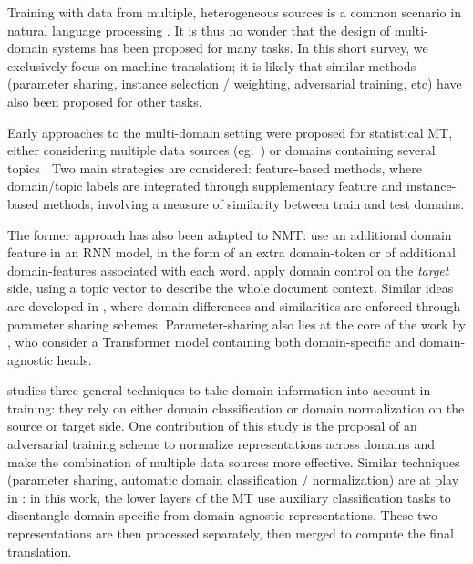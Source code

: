 \documentclass[11pt,a4paper]{article}
\begin{document}
Training with data from multiple, heterogeneous sources is a common scenario in natural language processing \cite{Dredze08online,Finkel09hierarchical}. It is thus no wonder that the design of multi-domain systems has been proposed for many tasks. In this short survey, we exclusively focus on machine translation; it is likely that similar methods (parameter sharing, instance selection / weighting, adversarial training, etc) have also been proposed for other tasks.

Early approaches to the multi-domain setting were proposed for statistical MT, either considering multiple data sources (eg.\ \cite{Banerjee10combining,Clark12onesystem,Sennrich13multidomain,Huck15mixeddomain}) or domains containing several topics \cite{Eidelman12topic,Hasler14dynamic-topic}. Two main strategies are considered: feature-based methods, where domain/topic labels are integrated through supplementary feature and instance-based methods, involving a measure of similarity between train and test domains. 

The former approach has also been adapted to NMT:  use an additional domain feature in an RNN model, in the form of an extra domain-token or of additional domain-features associated with each word. \citet{Chen16guided} apply domain control on the \emph{target} side, using a topic vector to describe the whole document context. Similar ideas are developed in \cite{Chu18multilingual,Pham19generic}, where domain differences and similarities are enforced through parameter sharing schemes. Parameter-sharing also lies at the core of the work by \citet{Jiang19multidomain}, who consider a Transformer model containing both domain-specific and domain-agnostic heads.

\citet{Britz17mixing} studies three general techniques to take domain information into account in training: they rely on either domain classification or domain normalization on the source or target side. One contribution of this study is the proposal of an adversarial training scheme to normalize representations across domains and make the combination of multiple data sources more effective. Similar techniques (parameter sharing, automatic domain classification / normalization) are at play in \cite{Zeng18multidomain}: in this work, the lower layers of the MT use auxiliary classification tasks to disentangle domain specific from domain-agnostic representations. These two representations are then processed separately, then merged to compute the final translation.
\end{document}
